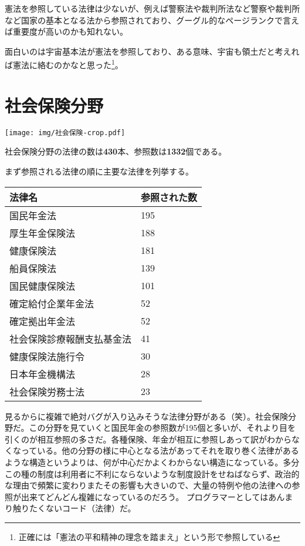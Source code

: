 \documentclass[a5j,openany,twoside]{jsbook}
\begin{document}
憲法を参照している法律は少ないが、例えば警察法や裁判所法など警察や裁判所など国家の基本となる法から参照されており、グーグル的なページランクで言えば重要度が高いのかも知れない。

面白いのは宇宙基本法が憲法を参照しており、ある意味、宇宙も領土だと考えれば憲法に絡むのかなと思った\footnote{正確には「憲法の平和精神の理念を踏まえ」という形で参照している}。

\section{社会保険分野}

\texttt{[image: img/社会保険-crop.pdf]}

社会保険分野の法律の数は\textbf{430}本、参照数は\textbf{1332}個である。

まず参照される法律の順に主要な法律を列挙する。


\begin{table}[htb]
  \begin{tabular}{|l|l|}  \hline
法律名 & 参照された数 \\ \hline \hline
国民年金法 & 195 \\
厚生年金保険法 & 188 \\
健康保険法 & 181 \\
船員保険法 & 139 \\
国民健康保険法 & 101 \\
確定給付企業年金法 & 52 \\
確定拠出年金法 & 52 \\
社会保険診療報酬支払基金法 & 41 \\
健康保険法施行令 & 30 \\
日本年金機構法 & 28 \\
社会保険労務士法 & 23 \\ \hline
  \end{tabular}
\end{table}

見るからに複雑で絶対バグが入り込みそうな法律分野がある（笑）。社会保険分野だ。この分野を見ていくと国民年金の参照数が195個と多いが、それより目を引くのが相互参照の多さだ。各種保険、年金が相互に参照しあって訳がわからなくなっている。他の分野の様に中心となる法があってそれを取り巻く法律があるような構造というよりは、何が中心だかよくわからない構造になっている。多分この種の制度は利用者に不利にならないような制度設計をせねばならず、政治的な理由で頻繁に変わりまたその影響も大きいので、大量の特例や他の法律への参照が出来てどんどん複雑になっているのだろう。
プログラマーとしてはあんまり触りたくないコード（法律）だ。
\end{document}
